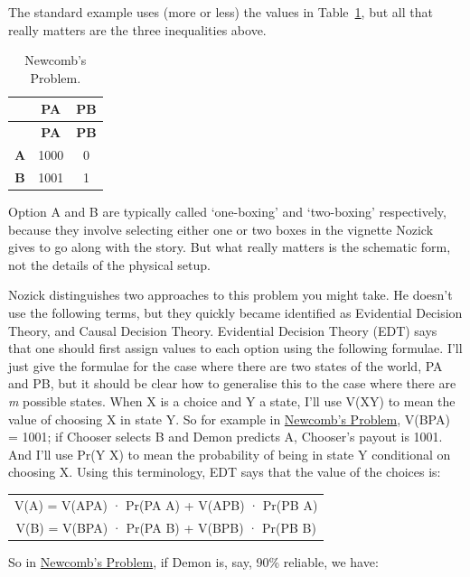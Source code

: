 \documentclass[
  12pt,
  letterpaper,
  DIV=11,
  numbers=noendperiod]{scrreprt}
\begin{document}
The standard example uses (more or less) the values in
Table~\ref{tbl-newcomb}, but all that really matters are the three
inequalities above.

\hypertarget{tbl-newcomb}{}
\begin{longtable}[]{@{}ccc@{}}
\caption{\label{tbl-newcomb}Newcomb's Problem.}\tabularnewline
\toprule\noalign{}
& \textbf{PA} & \textbf{PB} \\
\midrule\noalign{}
\endfirsthead
\toprule\noalign{}
& \textbf{PA} & \textbf{PB} \\
\midrule\noalign{}
\endhead
\bottomrule\noalign{}
\endlastfoot
\textbf{A} & 1000 & 0 \\
\textbf{B} & 1001 & 1 \\
\end{longtable}

Option A and B are typically called `one-boxing' and `two-boxing'
respectively, because they involve selecting either one or two boxes in
the vignette Nozick gives to go along with the story. But what really
matters is the schematic form, not the details of the physical setup.

Nozick distinguishes two approaches to this problem you might take. He
doesn't use the following terms, but they quickly became identified as
Evidential Decision Theory, and Causal Decision Theory. Evidential
Decision Theory (EDT) says that one should first assign values to each
option using the following formulae. I'll just give the formulae for the
case where there are two states of the world, PA and PB, but it should
be clear how to generalise this to the case where there are \emph{m}
possible states. When X is a choice and Y a state, I'll use V(XY) to
mean the value of choosing X in state Y. So for example in
\protect\hyperlink{tbl-newcomb}{Newcomb's Problem}, V(BPA) = 1001; if
Chooser selects B and Demon predicts A, Chooser's payout is 1001. And
I'll use Pr(Y \textbar{} X) to mean the probability of being in state Y
conditional on choosing X. Using this terminology, EDT says that the
value of the choices is:

\begin{longtable}[]{@{}c@{}}
\toprule\noalign{}
\endhead
\bottomrule\noalign{}
\endlastfoot
V(A) = V(APA) · Pr(PA \textbar{} A) + V(APB) · Pr(PB \textbar{} A) \\
V(B) = V(BPA) · Pr(PA \textbar{} B) + V(BPB) · Pr(PB \textbar{} B) \\
\end{longtable}

So in \protect\hyperlink{tbl-newcomb}{Newcomb's Problem}, if Demon is,
say, 90\% reliable, we have:
\end{document}
